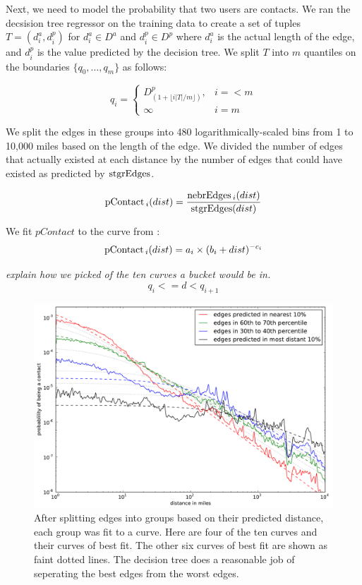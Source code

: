 Next, we need to model the probability that two users are contacts.
%
We ran the decsision tree regressor on the training data to create a set of
tuples $T = (d^a_i, d^p_i)$ for $d^a_i \in D^a$ and $d^p_i \in D^p$ where
$d^a_i$ is the actual length of the edge, and $d^p_i$ is the value predicted by
the decision
tree.
%
We split $T$ into $m$ quantiles on the boundaries $\{q_0,\dots,q_m\}$ as
follows:

\[
    q_i =
    \begin{cases}
        D^p_{(1+\lfloor i|T|/m \rfloor)}, & i=<m \\
        \infty & i=m
    \end{cases}
\]

We split the edges in these groups into 480 logarithmically-scaled bins from 1
to 10,000 miles based on the length of the edge.
%
We divided the number of edges that actually existed at each distance by the
number of edges that could have existed as predicted by $\operatorname{stgrEdges}$.

\[
\operatorname{pContact}{_i}(dist) = \frac{\operatorname{nebrEdges}{_i}(dist)}{\operatorname{stgrEdges}(dist)}
\]

We fit $pContact$ to the curve from \cite{backstrom2010find}:
\[
    \operatorname{pContact}{_i}(dist) = a_{i} \times (b_{i}+dist)^{-c_{i}}
\]

\emph{explain how we picked of the ten curves a bucket would be in.}
\[
    q_i<=d<q_{i+1}
\]

\begin{figure}[tbh]
\centering
\includegraphics[width=\linewidth]{figures/near_prob_fit.pdf}
\caption{
After splitting edges into groups based on their predicted distance, each group
was fit to a curve. Here are four of the ten curves and their curves of best
fit. The other six curves of best fit are shown as faint dotted lines. The
decision tree does a reasonable job of seperating the best edges from the worst
edges.
}
\label{fig:NearProbFit}
\end{figure}

